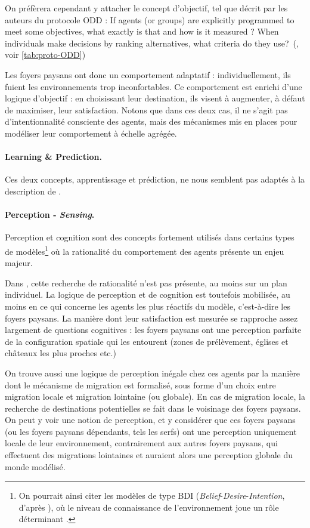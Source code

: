 On préfèrera cependant y attacher le concept d'\og objectif\fg{}, tel que décrit par les auteurs du protocole ODD : \og If agents (or groups) are explicitly programmed to meet some objectives, what exactly is that and how is it measured ? When individuals make decisions by ranking alternatives, what criteria do they use?\fg{}~(\cite[p. 353]{grimm_documenting_2017}, voir \cref{tab:proto-ODD})

Les foyers paysans ont donc un comportement adaptatif : individuellement, ils fuient les environnements trop inconfortables.
Ce comportement est enrichi d'une logique d'objectif : en choisissant leur destination, ils visent à augmenter, à défaut de maximiser, leur satisfaction.
Notons que dans ces deux cas, il ne s'agit pas d'intentionnalité consciente des agents, mais des mécanismes mis en places pour modéliser leur comportement à échelle agrégée.

\paragraph{Learning \& Prediction.} Ces deux concepts, apprentissage et prédiction, ne nous semblent pas adaptés à la description de \simfeodal{}.

\paragraph{Perception - \textit{Sensing}.}
Perception et cognition sont des concepts fortement utilisés dans certains types de modèles\footnote{
	On pourrait ainsi citer les modèles de type \og BDI\fg{} (\textit{Belief}-\textit{Desire}-\textit{Intention}, d'après \cite{bratman1988plans}), où le niveau de connaissance de l'environnement joue un rôle déterminant \autocite[183--184]{crooks_agent-based_2019}.
} où la rationalité du comportement des agents présente un enjeu majeur.

Dans \simfeodal{}, cette recherche de rationalité n'est pas présente, au moins sur un plan individuel.
La logique de perception et de cognition est toutefois mobilisée, au moins en ce qui concerne les agents les plus réactifs du modèle, c'est-à-dire les foyers paysans.
La manière dont leur satisfaction est mesurée se rapproche assez largement de questions cognitives : les foyers paysans ont une perception parfaite de la configuration spatiale qui les entourent (zones de prélèvement, églises et châteaux les plus proches etc.)

On trouve aussi une logique de perception inégale chez ces agents par la manière dont le mécanisme de migration est formalisé, sous forme d'un choix entre migration locale et migration lointaine (ou globale).
En cas de migration locale, la recherche de destinations potentielles se fait dans le voisinage des foyers paysans.
On peut y voir une notion de perception, et y considérer que ces foyers paysans (ou les foyers paysans \og dépendants\fg{}, tels les serfs) ont une perception uniquement locale de leur environnement, contrairement aux autres foyers paysans, qui effectuent des migrations lointaines et auraient alors une perception globale du monde modélisé.

